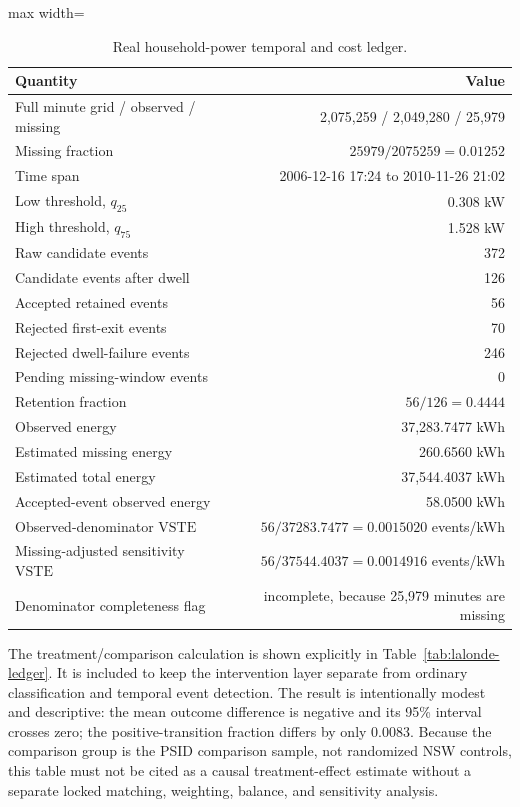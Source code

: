 \documentclass[11pt,a4paper]{article}
\newcommand{\VSTE}{\ensuremath{\mathrm{VSTE}}}
\newcommand{\1}{\mathbf{1}}
\begin{document}
\begin{table}[h]
\centering
\caption{Real household-power temporal and cost ledger.}
\label{tab:power-ledger}
\small
\begin{adjustbox}{max width=\linewidth}
\begin{tabular}{lr}
\toprule
Quantity & Value \\
\midrule
Full minute grid / observed / missing & 2,075,259 / 2,049,280 / 25,979 \\
Missing fraction & $25979/2075259=0.01252$ \\
Time span & 2006-12-16 17:24 to 2010-11-26 21:02 \\
Low threshold, $q_{25}$ & 0.308 kW \\
High threshold, $q_{75}$ & 1.528 kW \\
Raw candidate events & 372 \\
Candidate events after dwell & 126 \\
Accepted retained events & 56 \\
Rejected first-exit events & 70 \\
Rejected dwell-failure events & 246 \\
Pending missing-window events & 0 \\
Retention fraction & $56/126=0.4444$ \\
Observed energy & 37,283.7477 kWh \\
Estimated missing energy & 260.6560 kWh \\
Estimated total energy & 37,544.4037 kWh \\
Accepted-event observed energy & 58.0500 kWh \\
Observed-denominator \VSTE{} & $56/37283.7477=0.0015020$ events/kWh \\
Missing-adjusted sensitivity \VSTE{} & $56/37544.4037=0.0014916$ events/kWh \\
Denominator completeness flag & incomplete, because 25,979 minutes are missing \\
\bottomrule
\end{tabular}
\end{adjustbox}
\end{table}

The treatment/comparison calculation is shown explicitly in Table~\ref{tab:lalonde-ledger}. It is included to keep the intervention layer separate from ordinary classification and temporal event detection. The result is intentionally modest and descriptive: the mean outcome difference is negative and its 95\% interval crosses zero; the positive-transition fraction differs by only 0.0083. Because the comparison group is the PSID comparison sample, not randomized NSW controls, this table must not be cited as a causal treatment-effect estimate without a separate locked matching, weighting, balance, and sensitivity analysis.
\end{document}
